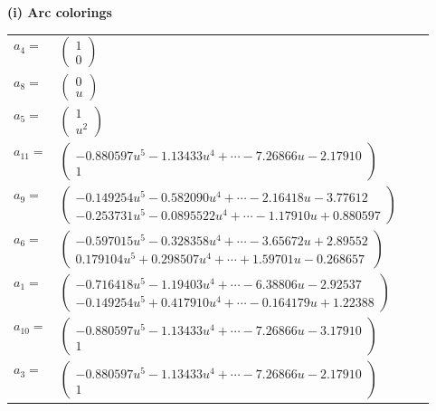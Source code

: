 \documentclass[1p]{elsarticle_modified}
\theoremstyle{definition}
\begin{document}
\flushleft \textbf{(i) Arc colorings}\\
\begin{tabular}{m{7pt} m{180pt} m{7pt} m{180pt} }
\flushright $a_{4}=$&$\begin{pmatrix}1\\0\end{pmatrix}$ \\
\flushright $a_{8}=$&$\begin{pmatrix}0\\u\end{pmatrix}$ \\
\flushright $a_{5}=$&$\begin{pmatrix}1\\u^2\end{pmatrix}$ \\
\flushright $a_{11}=$&$\begin{pmatrix}-0.880597 u^{5}-1.13433 u^{4}+\cdots-7.26866 u-2.17910\\1\end{pmatrix}$ \\
\flushright $a_{9}=$&$\begin{pmatrix}-0.149254 u^{5}-0.582090 u^{4}+\cdots-2.16418 u-3.77612\\-0.253731 u^{5}-0.0895522 u^{4}+\cdots-1.17910 u+0.880597\end{pmatrix}$ \\
\flushright $a_{6}=$&$\begin{pmatrix}-0.597015 u^{5}-0.328358 u^{4}+\cdots-3.65672 u+2.89552\\0.179104 u^{5}+0.298507 u^{4}+\cdots+1.59701 u-0.268657\end{pmatrix}$ \\
\flushright $a_{1}=$&$\begin{pmatrix}-0.716418 u^{5}-1.19403 u^{4}+\cdots-6.38806 u-2.92537\\-0.149254 u^{5}+0.417910 u^{4}+\cdots-0.164179 u+1.22388\end{pmatrix}$ \\
\flushright $a_{10}=$&$\begin{pmatrix}-0.880597 u^{5}-1.13433 u^{4}+\cdots-7.26866 u-3.17910\\1\end{pmatrix}$ \\
\flushright $a_{3}=$&$\begin{pmatrix}-0.880597 u^{5}-1.13433 u^{4}+\cdots-7.26866 u-2.17910\\1\end{pmatrix}$ \\

\end{tabular}
\end{document}
